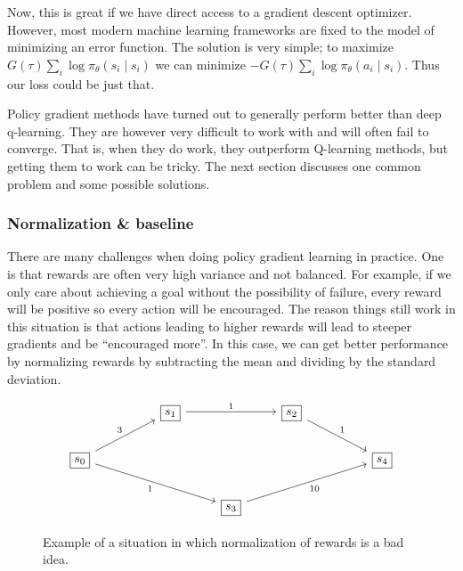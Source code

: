 \documentclass{article}
\theoremstyle{changedot}
\theoremstyle{changedotbreak}
\theoremstyle{nonumberplain}
\begin{document}
Now, this is great if we have direct access to a gradient descent optimizer. However, most modern machine learning frameworks are fixed to the model of minimizing an error function. The solution is very simple; to maximize $G(\tau) \sum_{i} \log \pi_{\theta} (s_{i} \mid s_{i})$ we can minimize $-G(\tau) \sum_{i} \log \pi_{\theta} (a_{i} \mid s_{i})$. Thus our loss could be just that.%

Policy gradient methods have turned out to generally perform better than deep q-learning. They are however very difficult to work with and will often fail to converge. That is, when they do work, they outperform Q-learning methods, but getting them to work can be tricky. The next section discusses one common problem and some possible solutions.

\subsubsection{Normalization \& baseline}
There are many challenges when doing policy gradient learning in practice. One is that rewards are often very high variance and not balanced. For example, if we only care about achieving a goal without the possibility of failure, every reward will be positive so every action will be encouraged. The reason things still work in this situation is that actions leading to higher rewards will lead to steeper gradients and be ``encouraged more''. In this case, we can get better performance by normalizing rewards by subtracting the mean and dividing by the standard deviation.

\begin{figure} 
\[\begin{tikzcd}
	&& {\boxed{s_1}} && {\boxed{s_2}} \\
	{\boxed{s_0}} &&&&&& {\boxed{s_4}} \\
	&&& {\boxed{s_3}}
	\arrow["3", from=2-1, to=1-3]
	\arrow["1"', from=2-1, to=3-4]
	\arrow["1", from=1-3, to=1-5]
	\arrow["1", from=1-5, to=2-7]
	\arrow["10"', from=3-4, to=2-7]
\end{tikzcd}\]
\caption{Example of a situation in which normalization of rewards is a bad idea.}
\label{fig:bad_norm}
\end{figure}
\end{document}
